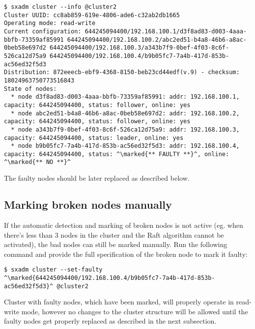 \begin{lstlisting}
$ sxadm cluster --info @cluster2
Cluster UUID: cc8ab859-619e-4806-ade6-c32ab2db1665
Operating mode: read-write
Current configuration: 644245094400/192.168.100.1/d3f8ad83-d003-4aaa-bbfb-73359af85991 644245094400/192.168.100.2/abc2ed51-b4a8-46b6-a8ac-0beb58e697d2 644245094400/192.168.100.3/a343b7f9-0bef-4f03-8c6f-526ca12d75a9 644245094400/192.168.100.4/b9b05fc7-7a4b-417d-853b-ac56ed32f5d3 
Distribution: 872eeecb-ebf9-4368-8150-beb23cd44edf(v.9) - checksum: 18024963750773516843
State of nodes:
  * node d3f8ad83-d003-4aaa-bbfb-73359af85991: addr: 192.168.100.1, capacity: 644245094400, status: follower, online: yes
  * node abc2ed51-b4a8-46b6-a8ac-0beb58e697d2: addr: 192.168.100.2, capacity: 644245094400, status: follower, online: yes
  * node a343b7f9-0bef-4f03-8c6f-526ca12d75a9: addr: 192.168.100.3, capacity: 644245094400, status: leader, online: yes
  * node b9b05fc7-7a4b-417d-853b-ac56ed32f5d3: addr: 192.168.100.4, capacity: 644245094400, status: ^\marked{** FAULTY **}^, online: ^\marked{** NO **}^
\end{lstlisting}
The faulty nodes should be later replaced as described below.

\subsection{Marking broken nodes manually}
If the automatic detection and marking of broken nodes is not active (eg. when
there's less than 3 nodes in the cluster and the Raft algorithm cannot be
activated), the bad nodes can still be marked manually. Run the following
command and provide the full specification of the broken node to mark it
faulty:
\begin{lstlisting}
$ sxadm cluster --set-faulty ^\marked{644245094400/192.168.100.4/b9b05fc7-7a4b-417d-853b-ac56ed32f5d3}^ @cluster2
\end{lstlisting}
Cluster with faulty nodes, which have been marked, will properly operate in
read-write mode, however no changes to the cluster structure will be allowed
until the faulty nodes get properly replaced as described in the next
subsection.

